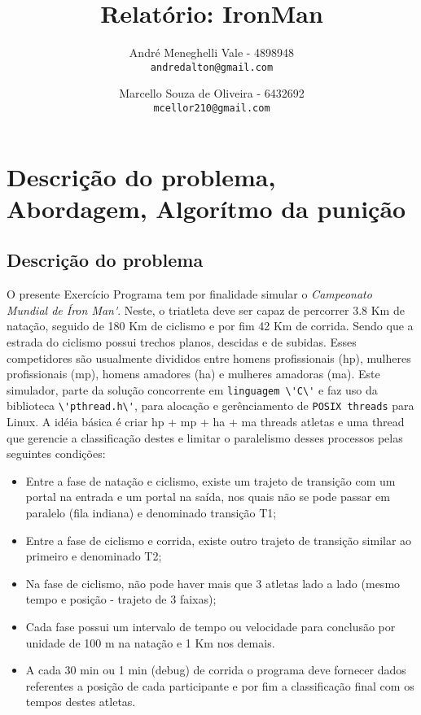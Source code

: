 \documentclass[12pt,a4paper]{article}
\author{
    André Meneghelli Vale - 4898948\\
    \texttt{andredalton@gmail.com}
    \and
    Marcello Souza de Oliveira - 6432692\\
    \texttt{mcellor210@gmail.com}
}
\title{Relatório: IronMan}
\begin{document}
\maketitle

\section{Descrição do problema, Abordagem, Algorítmo da punição}

\subsection{Descrição do problema}

   O presente Exercício Programa tem por finalidade simular o \emph{Campeonato Mundial 
de \'Iron Man\'}. Neste, o triatleta deve ser capaz de percorrer 3.8 Km de natação,
seguido de 180 Km de ciclismo e por fim 42 Km de corrida. Sendo que a estrada do ciclismo possui
trechos planos, descidas e de subidas. Esses competidores são usualmente
divididos entre homens profissionais (hp), mulheres profissionais (mp), homens
amadores (ha) e mulheres amadoras (ma).
   Este simulador, parte da solução concorrente em \verb+linguagem \'C\'+ e faz uso da
biblioteca \verb+\'pthread.h\'+, para alocação e gerênciamento de \verb+POSIX threads+ para
Linux. A idéia básica é criar hp + mp + ha + ma threads atletas e uma thread que
gerencie a classificação destes e limitar o paralelismo desses processos
pelas seguintes condições:

\begin{itemize}
\item Entre a fase de natação e ciclismo, existe um trajeto de transição com um
portal na entrada e um portal na saída, nos quais não se pode passar em paralelo
(fila indiana) e denominado transição T1;
\item Entre a fase de ciclismo e corrida, existe outro trajeto de transição
similar ao primeiro e denominado T2;
\item Na fase de ciclismo, não pode haver mais que 3 atletas lado a lado (mesmo
tempo e posição - trajeto de 3 faixas);
\item Cada fase possui um intervalo de tempo ou velocidade para conclusão por
unidade de 100 m na natação e 1 Km nos demais.
\item A cada 30 min ou 1 min (debug) de corrida o programa deve fornecer
dados referentes a posição de cada participante e por fim a classificação
final com os tempos destes atletas.
\end{itemize}
\end{document}

